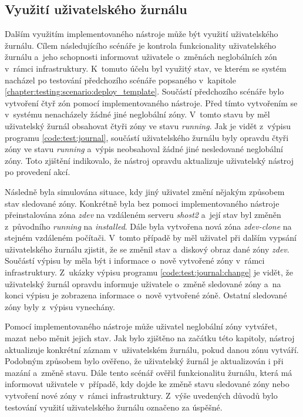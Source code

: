\subsection{Využití uživatelského žurnálu}
\label{chapter:testing:scenario:journal}
Dalším využitím implementovaného nástroje může být využití uživatelského žurnálu. Cílem následujícího scénáře je kontrola 
funkcionality uživatelského žurnálu a~jeho schopnosti informovat uživatele o~změnách neglobálních zón v~rámci infrastruktury.
K~tomuto účelu byl využitý stav, ve kterém se systém nacházel po testování předchozího scénáře popsaného v~kapitole
\ref{chapter:testing:scenario:deploy_template}. Součástí předchozího scénáře bylo vytvoření čtyř zón pomocí implementovaného
nástroje. Před tímto vytvořením se v~systému nenacházely žádné jiné neglobální zóny. V~tomto stavu by měl uživatelský žurnál 
obsahovat čtyři zóny ve stavu \textit{running}. Jak je vidět z~výpisu programu \ref{code:test:journal}, součástí uživatelského
žurnálu byly opravdu čtyři zóny ve stavu \textit{running} a~výpis neobsahoval žádné jiné nesledované neglobální zóny.
Toto zjištění indikovalo, že nástroj opravdu aktualizuje uživatelský nástroj po provedení akcí.

Následně byla simulována situace, kdy jiný uživatel změní nějakým způsobem stav sledované zóny. Konkrétně byla bez pomoci 
implementovaného nástroje přeinstalována zóna \textit{zdev} na vzdáleném serveru \textit{shost2} a~její stav byl změněn z~původního
\textit{running} na \textit{installed}. Dále byla vytvořena nová zóna \textit{zdev-clone} na stejném vzdáleném počítači. V~tomto
případě by měl uživatel při dalším vypsání uživatelského žurnálu zjistit, že se změnil stav a~diskový obraz dané zóny 
\textit{zdev}. Součástí výpisu by měla být i informace o~nově vytvořené zóny v~rámci infrastruktury. Z~ukázky výpisu programu 
\ref{code:test:journal:change} je vidět, že uživatelský žurnál opravdu informuje uživatele o~změně sledované zóny a~na konci
výpisu je zobrazena informace o~nově vytvořené zóně. Ostatní sledované zóny byly z~výpisu vynechány.

Pomocí implementovaného nástroje může uživatel neglobální zóny vytvářet, mazat nebo měnit jejich stav. Jak bylo zjištěno
na začátku této kapitoly, nástroj aktualizuje konkrétní záznam v~uživatelském žurnálu, pokud danou zónu vytváří. Podobným
způsobem bylo ověřeno, že uživatelský žurnál je aktualizován i při mazání a~změně stavu. Dále tento scénář ověřil funkcionalitu
žurnálu, která má informovat uživatele v~případě, kdy dojde ke změně stavu sledované zóny nebo vytvoření nové zóny v~rámci
infrastruktury. Z~výše uvedených důvodů bylo testování využití uživatelského žurnálu označeno za úspěšné.
